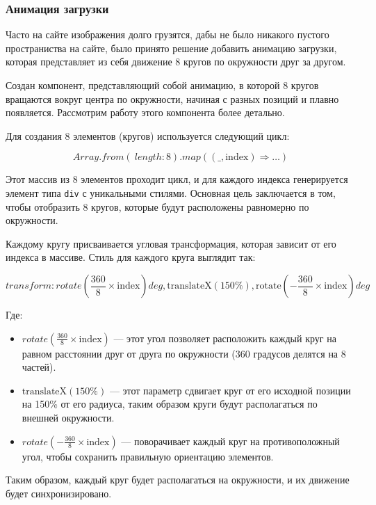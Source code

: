 \documentclass[a4paper,14pt]{extarticle}
\begin{document}
	\subsubsection{Анимация загрузки}
	
	Часто на сайте изображения долго грузятся, дабы не было никакого пустого пространиства на сайте, было принято решение добавить анимацию загрузки, которая представляет из себя движение 8 кругов по окружности друг за другом.
	
	Создан компонент, представляющий собой анимацию, в которой 8 кругов вращаются вокруг центра по окружности, начиная с разных позиций и плавно появляется. Рассмотрим работу этого компонента более детально.
	
	Для создания 8 элементов (кругов) используется следующий цикл:
	
	\[
	Array.from({\ length: 8 }).map((\_, \text{index}) \Rightarrow \ldots)
	\]
	
	Этот массив из 8 элементов проходит цикл, и для каждого индекса генерируется элемент типа \texttt{div} с уникальными стилями. Основная цель заключается в том, чтобы отобразить 8 кругов, которые будут расположены равномерно по окружности.
	
	Каждому кругу присваивается угловая трансформация, которая зависит от его индекса в массиве. Стиль для каждого круга выглядит так:
	
	\[
	transform: rotate\left(\frac{360}{8} \times \text{index}\right)deg, \text{translateX}(150\%), \text{rotate}\left(-\frac{360}{8} \times \text{index}\right)deg
	\]
	
	Где:
	\begin{itemize}
		\item $rotate\left(\frac{360}{8} \times \text{index}\right)$ — этот угол позволяет расположить каждый круг на равном расстоянии друг от друга по окружности (360 градусов делятся на 8 частей).
		\item $\text{translateX}(150\%)$ — этот параметр сдвигает круг от его исходной позиции на 150\% от его радиуса, таким образом круги будут располагаться по внешней окружности.
		\item $rotate\left(-\frac{360}{8} \times \text{index}\right)$ — поворачивает каждый круг на противоположный угол, чтобы сохранить правильную ориентацию элементов.
	\end{itemize}
	
	Таким образом, каждый круг будет располагаться на окружности, и их движение будет синхронизировано.
	
\end{document}
